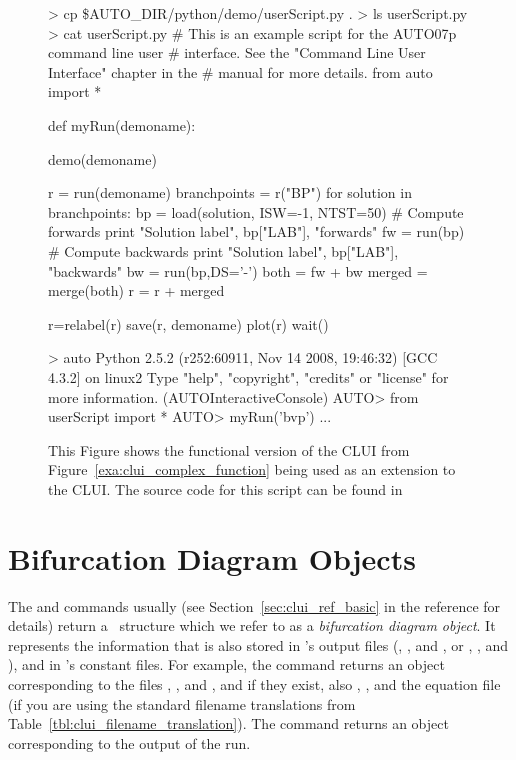 \documentclass[12pt]{report}
\begin{document}
 \begin{figure}[htbp]
 {\small \begin{center} \begin{boxedverbatim}
 > cp \$AUTO\_DIR/python/demo/userScript.py .
 > ls
 userScript.py
 > cat userScript.py
 # This is an example script for the AUTO07p command line user
 # interface.  See the "Command Line User Interface" chapter in the
 # manual for more details.
 from auto import *

 def myRun(demoname):

     demo(demoname)

     r = run(demoname)
     branchpoints = r("BP")
     for solution in branchpoints:
         bp = load(solution, ISW=-1, NTST=50)
         # Compute forwards
         print "Solution label", bp["LAB"], "forwards"
         fw = run(bp)
         # Compute backwards
         print "Solution label", bp["LAB"], "backwards"
         bw = run(bp,DS='-')
         both = fw + bw
         merged = merge(both)
         r = r + merged

     r=relabel(r)
     save(r, demoname)
     plot(r)
     wait()

 > auto
 Python 2.5.2 (r252:60911, Nov 14 2008, 19:46:32) 
 [GCC 4.3.2] on linux2
 Type "help", "copyright", "credits" or "license" for more information.
 (AUTOInteractiveConsole)
 AUTO> from userScript import *
 AUTO> myRun('bvp')
 ...
 \end{boxedverbatim}
 \end{center} 
 }
 \caption[An example of using a user created function interactively.]
 {This Figure shows the functional version of the
  \AUTO CLUI from Figure~\ref{exa:clui_complex_function} being 
 used as an extension to the \AUTO CLUI.  The source
 code for this script can be found in 
 }
 \label{exa:clui_complex_interactive}
 \end{figure}

 \section{ Bifurcation Diagram Objects}
 The  and  commands usually (see
 Section~\ref{sec:clui_ref_basic} in the reference for details)
 return a ~\python structure which we refer to as a \emph{bifurcation
 diagram object}. It represents the information that is also stored
 in \AUTO's output files (, ,
 and , or , , and ),
 and in \AUTO's constant files.
 For example, the command 
 returns an object corresponding to the files ,
 , and , and if they exist, also
 , , and the equation file
 (if you are using the standard
 filename translations from Table~\ref{tbl:clui_filename_translation}).
 The command  returns
 an object corresponding to the output of the run.
\end{document}
